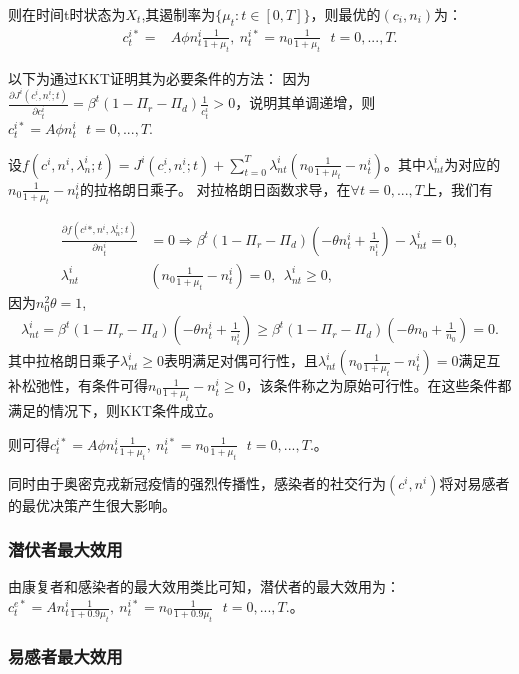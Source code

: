 则在时间t时状态为$X_t$,其遏制率为$\{\mu_t:t\in[0,T]\}$，则最优的$(c_i,n_i)$为：
\begin{align*}
    c_{t}^{i*}=&A \phi n_{t}^{i} \frac{1}{1+\mu_t},\ n_t^{i*}=n_0\frac{1}{1+\mu_t} \ \ \ t=0,...,T.
\end{align*}

以下为通过KKT证明其为必要条件的方法：
因为$\frac{\partial J^i(c_.^i,n_.^i;t)}{\partial c_t^i}=\beta^t (1-\Pi_r-\Pi_d) \frac{1}{c_t^i} >0$，说明其单调递增，则$c_{t}^{i*}=A \phi n_{t}^{i}\ \ \ t=0,...,T.$

设$f(c^i,n^i,\lambda_n^i;t)=J^i(c_.^i,n_.^i;t)+\sum_{t=0}^{T}\lambda_{nt}^i (n_0\frac{1}{1+\mu_t}-n_t^i)$。其中$\lambda_{nt}^i$为对应的$n_0\frac{1}{1+\mu_t}-n_t^i$的拉格朗日乘子。
对拉格朗日函数求导，在$\forall t=0,...,T$上，我们有

\begin{align*}
    \frac{\partial f(c^i*,n^i,\lambda_n^i;t)}{\partial n_t^i}&=0\Rightarrow \beta^t(1-\Pi_r-\Pi_d)(-\theta n_t^i+\frac{1}{n_t^i})-\lambda_{nt}^i=0, \\
    \lambda_{nt}^i&(n_0\frac{1}{1+\mu_t}-n_t^i)=0, \ \ \lambda_{nt}^i \geq 0 ,
\end{align*}
因为$n_0^2\theta=1$,
\begin{align*}
    \lambda_{nt}^i=\beta^t(1-\Pi_r-\Pi_d)(-\theta n_t^i+\frac{1}{n_t^i}) \geq \beta^t(1-\Pi_r-\Pi_d)(-\theta n_0+\frac{1}{n_0})=0.
\end{align*}
其中拉格朗日乘子$\lambda_{nt}^i \geq 0$表明满足对偶可行性，且$\lambda_{nt}^i(n_0\frac{1}{1+\mu_t}-n_t^i)=0$满足互补松弛性，有条件可得$n_0\frac{1}{1+\mu_t}-n_t^i \geq 0$，该条件称之为原始可行性。在这些条件都满足的情况下，则KKT条件成立。

则可得$c_{t}^{i*}=A \phi n_{t}^{i} \frac{1}{1+\mu_t},\ n_t^{i*}=n_0\frac{1}{1+\mu_t} \ \ \ t=0,...,T.$。

同时由于奥密克戎新冠疫情的强烈传播性，感染者的社交行为$(c^i,n^i)$将对易感者的最优决策产生很大影响。

\subsubsection{潜伏者最大效用}

由康复者和感染者的最大效用类比可知，潜伏者的最大效用为：$c_{t}^{e*}=A n_{t}^{i} \frac{1}{1+0.9 \mu_t},\ n_t^{i*}=n_0\frac{1}{1+0.9 \mu_t} \ \ \ t=0,...,T.$。

\subsubsection{易感者最大效用}

